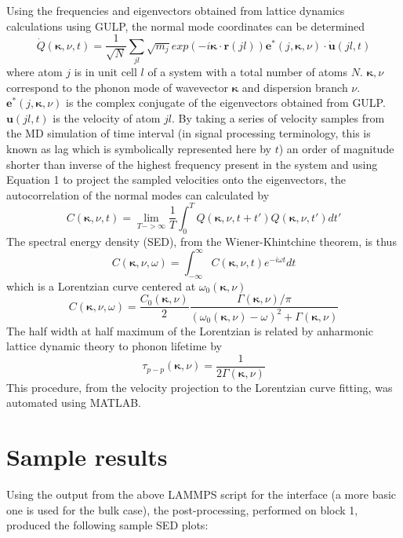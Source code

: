 \documentclass{article}
\begin{document}
Using the frequencies and eigenvectors obtained from lattice dynamics calculations using GULP, the normal mode coordinates can be determined
\begin{equation}
\dot{Q}(\pmb{\kappa},\nu,t)=\frac{1}{\sqrt{N}}\sum_{jl}\sqrt{m_j}exp(-i\pmb{\kappa}\cdot\pmb{r}(jl))\pmb{e}^*(j,\pmb{\kappa},\nu)\cdot\dot{\pmb{u}}(jl,t)
\end{equation}
where atom $j$ is in unit cell $l$ of a system with a total number of atoms $N$. $\pmb{\kappa},\nu$ correspond to the phonon mode of wavevector $\pmb{\kappa}$ and dispersion branch $\nu$. $\pmb{e}^*(j,\pmb{\kappa},\nu)$ is the complex conjugate of the eigenvectors obtained from GULP. ${\pmb{u}}(jl,t)$ is the velocity of atom $jl$. By taking a series of velocity samples from the MD simulation of time interval (in signal processing terminology, this is known as lag which is symbolically represented here by $t$) an order of magnitude shorter than inverse of the highest frequency present in the system and using Equation 1 to project the sampled velocities onto the eigenvectors, the autocorrelation of the normal modes can calculated by
\begin{equation}
C(\pmb{\kappa},\nu,t)=\lim_{T->\infty}\frac{1}{T}\int_{0}^{T}Q(\pmb{\kappa},\nu,t+t')Q(\pmb{\kappa},\nu,t')dt'
\end{equation}
The spectral energy density (SED), from the Wiener-Khintchine theorem, is thus
\begin{equation}
C(\pmb{\kappa},\nu,\omega)=\int_{-\infty}^{\infty}C(\pmb{\kappa},\nu,t)e^{-i\omega t}dt
\end{equation}
which is a Lorentzian curve centered at $\omega_0(\pmb{\kappa},\nu)$
\begin{equation}
C(\pmb{\kappa},\nu,\omega)=\frac{C_0(\pmb{\kappa},\nu)}{2}\frac{\Gamma(\pmb{\kappa},\nu)/\pi}{(\omega_0(\pmb{\kappa},\nu)-\omega)^2+\Gamma(\pmb{\kappa},\nu)}
\end{equation}
The half width at half maximum of the Lorentzian is related by anharmonic lattice dynamic theory to phonon lifetime by
\begin{equation}
\tau_{p-p}(\pmb{\kappa}, \nu)=\frac{1}{2\Gamma(\pmb{\kappa},\nu)}
\end{equation}
This procedure, from the velocity projection to the Lorentzian curve fitting, was automated using MATLAB.

\section*{Sample results}
Using the output from the above LAMMPS script for the interface (a more basic one is used for the bulk case), the post-processing, performed on block 1, produced the following sample SED plots:
\end{document}
